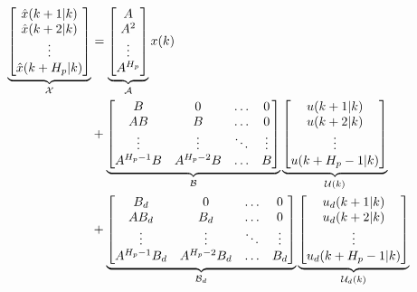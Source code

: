 \begin{equation}
\begin{aligned}
	  \underbrace{\begin{bmatrix}
	  \hat{x}(k+1|k) 	\\
	  \hat{x}(k+2|k) 	\\
	  \vdots 			\\
	  \hat{x}(k+H_p|k) 	\\
	   \end{bmatrix}}_{\CMcal{X}}
	 &=
	\underbrace{\begin{bmatrix}
		A \\
		A^2 \\
		\vdots \\
		A^{H_p} \\
	\end{bmatrix}}_{\CMcal{A}}
	x(k) \\&+
	\underbrace{\begin{bmatrix}
		B 		 &0			 &\hdots	& 0		\\
		AB  	 &B  		 & \hdots& 0		\\
		\vdots 	 &\vdots	 & \ddots&\vdots	\\
		A^{H_p-1}B&A^{H_p-2}B&\hdots &B 
    \end{bmatrix}}_{\CMcal{B}}
    	\underbrace{\begin{bmatrix}
	u(k+1|k)\\
	u(k+2|k)\\
	\vdots\\
	u(k+H_p-1|k)
	\end{bmatrix}}_{\CMcal{U}(k)} \\ &+ 
    \underbrace{\begin{bmatrix}
    	B_d 	    &0	         &\hdots & 0		\\
		AB_d  	    &B_d  	     & \hdots& 0		\\
		\vdots 	    &\vdots	     & \ddots&\vdots	\\
		A^{H_p-1}B_d&A^{H_p-2}B_d&\hdots &B_d 
	  \end{bmatrix}}_{\CMcal{B}_d} 
	\underbrace{\begin{bmatrix}
	u_d(k+1|k)\\
	u_d(k+2|k)\\
	\vdots\\
	u_d(k+H_p-1|k)
	\end{bmatrix}}_{\CMcal{U}_d(k)}
	\end{aligned}
\end{equation}






